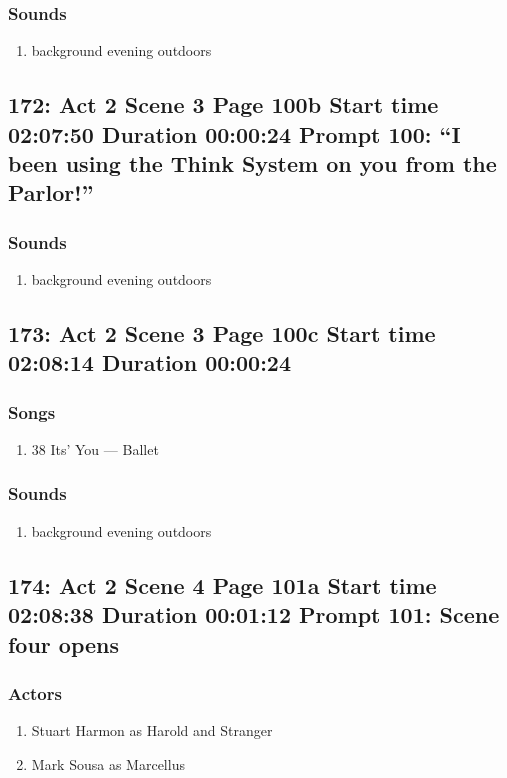 \subsubsection{Sounds}
\begin{enumerate}
\item background evening outdoors
\end{enumerate}
\subsection{172: Act 2 Scene 3 Page 100b Start time 02:07:50 Duration 00:00:24 Prompt 100: ``I been using the Think System on you from the Parlor!''}
\subsubsection{Sounds}
\begin{enumerate}
\item background evening outdoors
\end{enumerate}
\subsection{173: Act 2 Scene 3 Page 100c Start time 02:08:14 Duration 00:00:24}
\subsubsection{Songs}
\begin{enumerate}
\item 38 Its' You --- Ballet
\end{enumerate}\subsubsection{Sounds}
\begin{enumerate}
\item background evening outdoors
\end{enumerate}
\subsection{174: Act 2 Scene 4 Page 101a Start time 02:08:38 Duration 00:01:12 Prompt 101: Scene four opens}

\subsubsection{Actors}
\begin{enumerate}
\item Stuart Harmon as Harold and Stranger
\item Mark Sousa as Marcellus
\end{enumerate}

